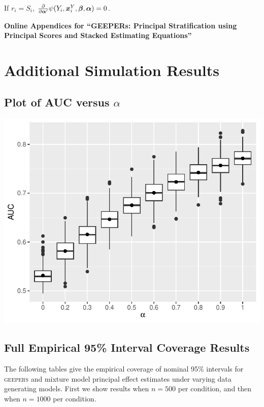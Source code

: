 \documentclass[]{article}
\begin{document}
If $r_i=S_i$, $\frac{\partial}{\partial \bm{\alpha}'}\psi(Y_i,\bm{x}^Y_i,\bm{\beta},\bm{\alpha})=0$.

\clearpage



\setcounter{page}{1}

\begin{center}
\large
    \textbf{Online Appendices for ``GEEPERs: Principal Stratification using Principal Scores and Stacked Estimating Equations''}
\end{center}
\section{Additional Simulation Results}
\subsection{Plot of  AUC versus $\alpha$}

\begin{center}

    \includegraphics[width=5.5in]{../simFigs/alphaAUC.pdf}

\end{center}
\clearpage

\subsection{Full Empirical 95\% Interval Coverage Results}
The following tables give the empirical coverage of nominal 95\% intervals for \textsc{geepers} and mixture model principal effect estimates under varying data generating models. First we show results when $n=500$ per condition, and then when $n=1000$ per condition. \\
\end{document}
